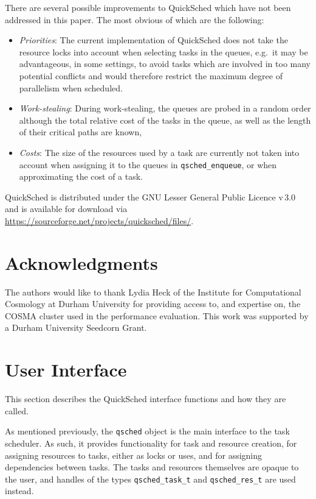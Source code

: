 \documentclass[preprint]{elsarticle}
\begin{document}
There are several possible improvements to QuickSched which
have not been addressed in this paper.
The most obvious of which are the following:
\begin{itemize}
    \item {\em Priorities}: The current implementation of
        QuickSched does not take the resource locks into
        account when selecting tasks in the queues, e.g.~it
        may be advantageous, in some settings, to avoid tasks
        which are involved in too many potential conflicts
        and would therefore restrict the maximum degree of
        parallelism when scheduled.
    \item {\em Work-stealing}: During work-stealing, the
        queues are probed in a random order although
        the total relative cost of the tasks in the queue,
        as well as the length of their critical paths are
        known,
    \item {\em Costs}: The size of the resources used by
        a task are currently not taken into account when
        assigning it to the queues in {\tt qsched\_enqueue},
        or when approximating the cost of a task.
\end{itemize}

QuickSched is distributed under the GNU Lesser General Public Licence
v\,3.0 and is available for download via
\url{https://sourceforge.net/projects/quicksched/files/}.


\section*{Acknowledgments}
The authors would like to thank Lydia Heck of the Institute for
Computational Cosmology at Durham University for providing access
to, and expertise on, the COSMA cluster used in the performance
evaluation.
This work was supported by a Durham University Seedcorn Grant.






\appendix
\section{User Interface}

This section describes the QuickSched interface functions and how they
are called.

As mentioned previously, the {\tt qsched} object is the main
interface to the task scheduler.
As such, it provides functionality for task and resource
creation, for assigning resources to tasks, either as locks
or uses, and for assigning dependencies between tasks.
The tasks and resources themselves are opaque to the
user, and handles of the types {\tt qsched\_task\_t}
and {\tt qsched\_res\_t} are used instead.
\end{document}

